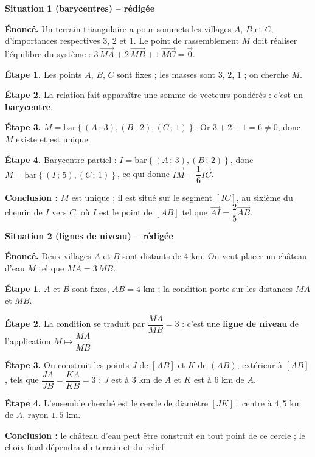 \documentclass[10pt,a4paper]{article}
\newcommand{\vc}[1]{\overrightarrow{#1}}                     %
\newcommand{\barG}[1]{\mathrm{bar}\left\{#1\right\}}          %
\newenvironment{encadre}[3][10]{%
  \par\needspace{#1\baselineskip}\addvspace{6pt}\noindent
  \def\encColor{#2}%
  \begin{lrbox}{\encbox}%
  \begin{minipage}{\dimexpr\linewidth-2\fboxsep-2\fboxrule-0.5pt\relax}%
  \raggedright{\color{#2}\bfseries #3}\par\smallskip}%
  {\end{minipage}\end{lrbox}%
  \noindent\fcolorbox{\encColor}{\encColor!7}{\usebox{\encbox}}\par\addvspace{6pt}}
\begin{document}
\begin{encadre}[20]{cEx}{Situation 1 (barycentres) -- rédigée}
\textbf{Énoncé.} Un terrain triangulaire a pour sommets les villages $A$, $B$ et $C$, d'importances respectives $3$, $2$ et $1$. Le point de rassemblement $M$ doit réaliser l'équilibre du système : $3\,\vc{MA}+2\,\vc{MB}+1\,\vc{MC}=\vc{0}$.\par
\textbf{Étape 1.} Les points $A$, $B$, $C$ sont fixes ; les masses sont $3$, $2$, $1$ ; on cherche $M$.\par
\textbf{Étape 2.} La relation fait apparaître une somme de vecteurs pondérés : c'est un \textbf{barycentre}.\par
\textbf{Étape 3.} $M=\barG{(A\,;\,3),(B\,;\,2),(C\,;\,1)}$. Or $3+2+1=6\neq 0$, donc $M$ existe et est unique.\par
\textbf{Étape 4.} Barycentre partiel : $I=\barG{(A\,;\,3),(B\,;\,2)}$, donc $M=\barG{(I\,;\,5),(C\,;\,1)}$, ce qui donne $\vc{IM}=\dfrac{1}{6}\vc{IC}$.\par
\textbf{Conclusion :} $M$ est unique ; il est situé sur le segment $[IC]$, au sixième du chemin de $I$ vers $C$, où $I$ est le point de $[AB]$ tel que $\vc{AI}=\dfrac{2}{5}\vc{AB}$.
\end{encadre}

\begin{encadre}[20]{cEx}{Situation 2 (lignes de niveau) -- rédigée}
\textbf{Énoncé.} Deux villages $A$ et $B$ sont distants de $4$ km. On veut placer un château d'eau $M$ tel que $MA=3\,MB$.\par
\textbf{Étape 1.} $A$ et $B$ sont fixes, $AB=4$ km ; la condition porte sur les distances $MA$ et $MB$.\par
\textbf{Étape 2.} La condition se traduit par $\dfrac{MA}{MB}=3$ : c'est une \textbf{ligne de niveau} de l'application $M\mapsto\dfrac{MA}{MB}$.\par
\textbf{Étape 3.} On construit les points $J$ de $[AB]$ et $K$ de $(AB)$, extérieur à $[AB]$, tels que $\dfrac{JA}{JB}=\dfrac{KA}{KB}=3$ : $J$ est à $3$ km de $A$ et $K$ est à $6$ km de $A$.\par
\textbf{Étape 4.} L'ensemble cherché est le cercle de diamètre $[JK]$ : centre à $4{,}5$ km de $A$, rayon $1{,}5$ km.\par
\textbf{Conclusion :} le château d'eau peut être construit en tout point de ce cercle ; le choix final dépendra du terrain et du relief.
\end{encadre}
\end{document}
